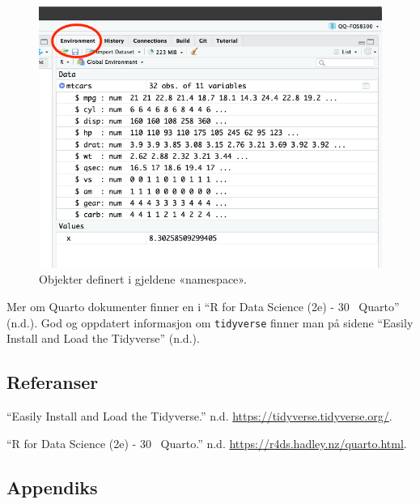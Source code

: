 \documentclass[
  letterpaper,
  DIV=11,
  numbers=noendperiod]{scrartcl}
\newlength{\cslhangindent}
\newlength{\cslentryspacingunit} %
\newenvironment{CSLReferences}[2] %
 {%
  \setlength{\parindent}{0pt}
  \ifodd #1
  \let\oldpar\par
  \def\par{\hangindent=\cslhangindent\oldpar}
  \fi
  \setlength{\parskip}{#2\cslentryspacingunit}
 }%
 {}
\begin{document}
\begin{figure}

{\centering \includegraphics{Env.png}

}

\caption{\label{fig-env}Objekter definert i gjeldene «namespace».}

\end{figure}

Mer om Quarto dokumenter finner en i {``R for {Data Science} (2e) - 30~
{Quarto}''} (n.d.). God og oppdatert informasjon om \texttt{tidyverse}
finner man på sidene {``Easily {Install} and {Load} the {Tidyverse}''}
(n.d.).

\hypertarget{referanser}{%
\subsection{Referanser}\label{referanser}}

\hypertarget{refs}{}
\begin{CSLReferences}{1}{0}
\leavevmode{}%
{``Easily {Install} and {Load} the {Tidyverse}.''} n.d.
\url{https://tidyverse.tidyverse.org/}.

\leavevmode{}%
{``R for {Data Science} (2e) - 30~ {Quarto}.''} n.d.
\url{https://r4ds.hadley.nz/quarto.html}.

\end{CSLReferences}

\hypertarget{appendiks}{%
\subsection{Appendiks}\label{appendiks}}
\end{document}
